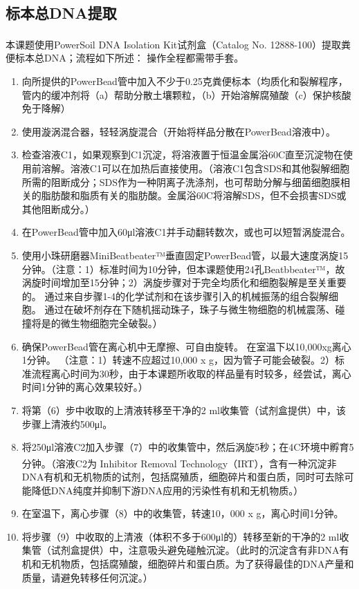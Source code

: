   \subsection{标本总DNA提取}
  \label{标本总DNA提取}
  本课题使用PowerSoil\textsuperscript{\textregistered} DNA Isolation Kit试剂盒（Catalog No. 12888-100）提取粪便标本总DNA；流程如下所述：
  操作全程都需带手套。
    \begin{enumerate}
      \item 向所提供的PowerBead管中加入不少于0.25克粪便标本（均质化和裂解程序，管内的缓冲剂将（a）帮助分散土壤颗粒，（b）开始溶解腐殖酸（c）保护核酸免于降解）
      \item 使用漩涡混合器，轻轻涡旋混合（开始将样品分散在PowerBead溶液中）。
      \item 检查溶液C1，如果观察到C1沉淀，将溶液置于恒温金属浴60\textdegree C直至沉淀物在使用前溶解。溶液C1可以在加热后直接使用。（溶液C1包含SDS和其他裂解细胞所需的阻断成分；SDS作为一种阴离子洗涤剂，也可帮助分解与细菌细胞膜相关的脂肪酸和脂质有关的脂肪酸。金属浴60\textdegree C将溶解SDS，但不会损害SDS或其他阻断成分。）
      \item 在PowerBead管中加入60μl溶液C1并手动翻转数次，或也可以短暂涡旋混合。
      \item 使用小珠研磨器MiniBeatbeater™垂直固定PowerBead管，以最大速度涡旋15分钟。（注意：1）标准时间为10分钟，但本课题使用24孔Beatbbeater™，故涡旋时间增加至15分钟；2）涡旋步骤对于完全均质化和细胞裂解是至关重要的。 通过来自步骤1-4的化学试剂和在该步骤引入的机械振荡的组合裂解细胞。 通过在破坏剂存在下随机摇动珠子，珠子与微生物细胞的机械震荡、碰撞将是的微生物细胞完全破裂。）
      \item 确保PowerBead管在离心机中无摩擦、可自由旋转。 在室温下以10,000xg离心1分钟。 （注意：1）转速不应超过10,000 x g，因为管子可能会破裂。2）标准流程离心时间为30秒，由于本课题所收取的样品量有时较多，经尝试，离心时间1分钟的离心效果较好。）
      \item 将第（6）步中收取的上清液转移至干净的2 ml收集管（试剂盒提供）中，该步骤上清液约500μl。
      \item 将250μl溶液C2加入步骤（7）中的收集管中，然后涡旋5秒；在4\textdegree C环境中孵育5分钟。（溶液C2为 Inhibitor Removal Technology\textsuperscript{\textregistered}（IRT），含有一种沉淀非DNA有机和无机物质的试剂，包括腐殖质，细胞碎片和蛋白质，同时可去除可能降低DNA纯度并抑制下游DNA应用的污染性有机和无机物质。）
      \item 在室温下，离心步骤（8）中的收集管，转速10，000 x g，离心时间1分钟。
      \item 将步骤（9）中收取的上清液（体积不多于600μl的）转移至新的干净的2 ml收集管（试剂盒提供）中，注意吸头避免碰触沉淀。（此时的沉淀含有非DNA有机和无机物质，包括腐殖酸，细胞碎片和蛋白质。为了获得最佳的DNA产量和质量，请避免转移任何沉淀。）

\end{enumerate}
